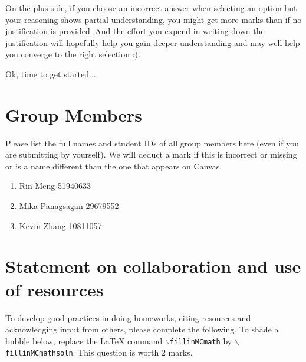 \documentclass[11pt,fleqn]{exam}
\newenvironment{soln}{\color{solnblue}}{}
\begin{document}
	On the  plus side, if  you choose an  incorrect answer when  selecting an option  but your
	reasoning shows partial  understanding, you might get more marks  than if no justification
	is provided. And  the effort you expend  in writing down the  justification will hopefully
	help you gain deeper  understanding and may well help you converge  to the right selection
	:).
	
	\vspace{.1in}
	
	Ok, time to get started...
	
	\clearpage
	
	\section*{Group Members}
	
	Please list the full names and student IDs of all group members here (even if you are submitting by yourself). We will deduct a mark if this is incorrect or missing or is a name different than the one that appears on Canvas.
\begin{soln}
	\begin{enumerate}
		\item Rin Meng 51940633
		\item Mika Panagsagan 29679552
		\item Kevin Zhang 10811057
	\end{enumerate}
\end{soln}
 \section{Statement on collaboration and use of resources}
To develop good practices in doing homeworks,
citing resources and acknowledging input from others, please complete the following. To shade a bubble below, replace the LaTeX command \texttt{$\backslash$fillinMCmath} by \texttt{$\backslash$fillinMCmathsoln}.
This question is worth 2 marks.
\end{document}
